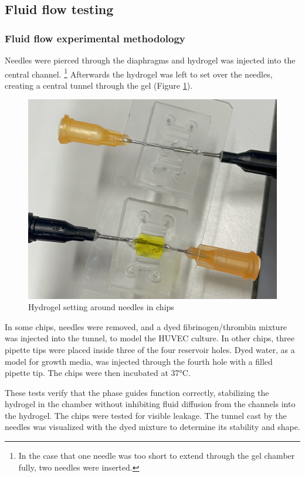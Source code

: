 \documentclass[letterpaper,12pt]{article}
\begin{document}
\subsection{Fluid flow testing}

\subsubsection{Fluid flow experimental methodology}

Needles were pierced through the diaphragms and hydrogel was injected into the central channel. \footnote{In the case that one needle was too short to extend through the gel chamber fully, two needles were inserted.} Afterwards the hydrogel was left to set over the needles, creating a central tunnel through the gel (Figure \ref{fig:W}).

\begin{figure}[h!]
    \centering
    \includegraphics[width=0.75\linewidth]{dapp_report/figures/Fig W 5;4.jpeg}
    \caption{Hydrogel setting around needles in chips}
    \label{fig:W}
\end{figure}

In some chips, needles were removed, and a dyed fibrinogen/thrombin mixture was injected into the tunnel, to model the HUVEC culture. In other chips, three pipette tips were placed inside three of the four reservoir holes. Dyed water, as a model for growth media, was injected through the fourth hole with a filled pipette tip. The chips were then incubated at 37°C. 

These tests verify that the phase guides function correctly, stabilizing the hydrogel in the chamber without inhibiting fluid diffusion from the channels into the hydrogel. The chips were tested for visible leakage. The tunnel cast by the needles was visualized with the dyed mixture to determine its stability and shape. 
\end{document}
